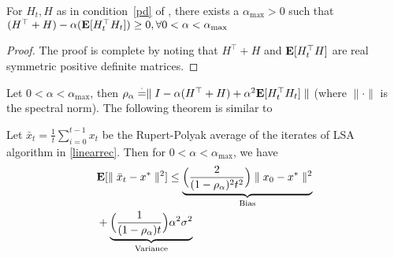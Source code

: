 \begin{lemma}
For $H_t, H$ as in condition~\ref{pd} of , there exists a $\alpha_{\max}>0$ such that $(H^\top+H)-\alpha (\mathbf{E}[H_t^\top H_t])\geq 0, \forall 0< \alpha<\alpha_{\max}$ 
\end{lemma}
\begin{proof}
The proof is complete by noting that $H^\top+H$ and $\mathbf{E}[H^\top_t H]$ are real symmetric positive definite matrices.
\end{proof}
Let $0<\alpha<\alpha_{\max}$, then $\rho_{\alpha}\stackrel{\cdot}{=}\parallel I-\alpha(H^\top+H)+\alpha^2\mathbf{E}[H^\top_t H_t]\parallel$ (where $\parallel\cdot\parallel$ is the spectral norm). The following theorem is similar to 
\begin{theorem}
Let $\bar{x}_t=\frac{1}{t}\sum_{i=0}^{t-1} x_t$ be the Rupert-Polyak average of the iterates of LSA algorithm in \eqref{linearrec}. Then for $0<\alpha< \alpha_{\max}$, we have
\begin{align}
&\mathbf{E}[\parallel \bar{x}_t-x^*\parallel^2]\leq \underbrace{\Big(\frac{2}{(1-\rho_{\alpha})^2t^2}\Big)\parallel x_0-x^*\parallel^2}_{\text{Bias}}\\&+\underbrace{\Big(\frac{1}{(1-\rho_{\alpha})t}\Big)\alpha^2\sigma^2}_{\text{Variance}}
\end{align}
\end{theorem}
